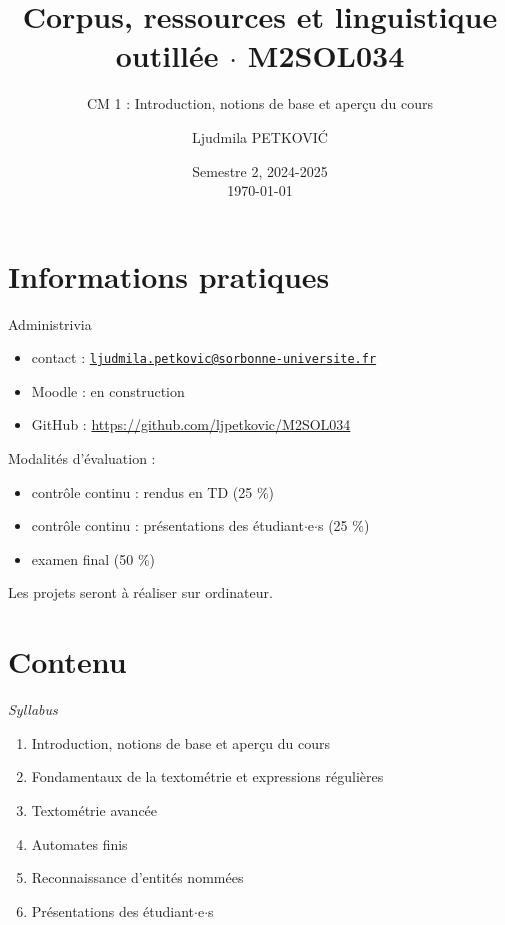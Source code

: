 \documentclass[xetex,xcolor={table,usenames,dvipsnames}]{beamer}
\begin{document}
\title{{\large Corpus, ressources et linguistique outillée $\cdot$ \textsc{M2SOL034}}}
\subtitle{CM 1 : Introduction, notions de base et aperçu du cours}
\author{\footnotesize{Ljudmila PETKOVI\'C}}
\date{\scriptsize{Semestre 2, 2024-2025\\\today}}



	\frame{\titlepage}

\section{Informations pratiques}

\begin{frame}{Administrivia}
	\begin{itemize}
		\item contact : \href{mailto:ljudmila.petkovic@sorbonne-universite.fr}{\texttt{ljudmila.petkovic@sorbonne-universite.fr}}
		\item Moodle : en construction
		\item GitHub : \url{https://github.com/ljpetkovic/M2SOL034}
	\end{itemize}
	Modalités d'évaluation :
	\begin{itemize}
		\item contrôle continu : rendus en TD (25 \%)
		\item contrôle continu : présentations des étudiant$\cdot$e$\cdot$s  (25 \%)
		\item examen final (50 \%)
	\end{itemize}
	{\small Les projets seront à réaliser sur ordinateur.}
\end{frame}

\section{Contenu} 

\begin{frame}{\textit{Syllabus}}
	\begin{enumerate}
		\item Introduction, notions de base et aperçu du cours
		\item Fondamentaux de la textométrie et expressions régulières
		\item Textométrie avancée
		\item Automates finis
		\item Reconnaissance d'entités nommées
		\item Présentations des étudiant$\cdot$e$\cdot$s
	\end{enumerate}
\end{frame}
\end{document}
